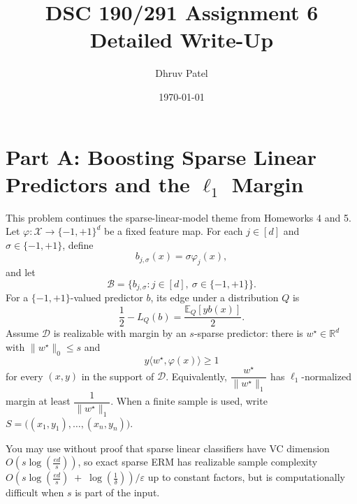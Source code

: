 \documentclass[11pt]{article}
\title{\textbf{DSC 190/291 Assignment 6}\\Detailed Write-Up}
\author{Dhruv Patel}
\date{\today}
\newcommand{\E}{\mathbb{E}}
\begin{document}
\maketitle
\tableofcontents
\newpage

\section{Part A: Boosting Sparse Linear Predictors and the $\ell_1$ Margin}

This problem continues the sparse-linear-model theme from Homeworks 4 and 5. Let
$\varphi:\mathcal X\to \{-1,+1\}^d$ be a fixed feature map. For each $j\in[d]$ and
$\sigma\in\{-1,+1\}$, define
\[
b_{j,\sigma}(x)=\sigma\varphi_j(x),
\]
and let
\[
\mathcal B=\{b_{j,\sigma}:j\in[d],\ \sigma\in\{-1,+1\}\}.
\]
For a $\{-1,+1\}$-valued predictor $b$, its edge under a distribution $Q$ is
\[
\frac12-L_Q(b)=\frac{\E_Q[yb(x)]}{2}.
\]
Assume $\mathcal D$ is realizable with margin by an $s$-sparse predictor: there is
$w^\star\in\mathbb R^d$ with $\|w^\star\|_0\le s$ and
\[
y\langle w^\star,\varphi(x)\rangle\ge 1
\]
for every $(x,y)$ in the support of $\mathcal D$. Equivalently, $\dfrac{w^\star}{\|w^\star\|_1}$ has $\ell_1$-normalized margin at least 
$\dfrac{1}{\|w^\star\|_1}$. When a finite sample is used, write $
S = \bigl((x_1,y_1),\ldots,(x_n,y_n)\bigr).$

You may use without proof that sparse linear classifiers have VC dimension 
$O\!\left(s \log\!\left(\frac{e d}{s}\right)\right)$, 
so exact sparse ERM has realizable sample complexity
$
O\!\left( 
s \log\!\left(\frac{e d}{s}\right) 
\;+\; \log\!\left(\frac{1}{\delta}\right)
\right)\Big/ \varepsilon
$ up to constant factors, but is computationally difficult when $s$ is part of the input.
\end{document}
